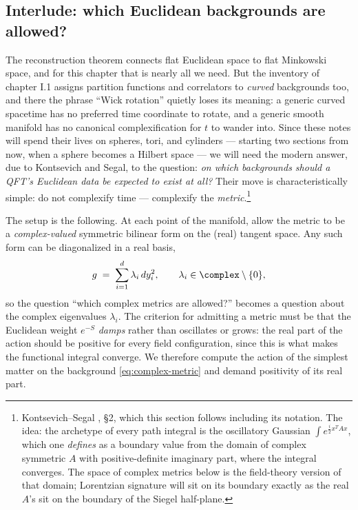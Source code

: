 \subsection{Interlude: which Euclidean backgrounds are allowed?}
\label{sec:ks-interlude}

The reconstruction theorem connects flat Euclidean space to flat Minkowski
space, and for this chapter that is nearly all we need. But the inventory of
chapter I.1 assigns partition functions and correlators to \emph{curved}
backgrounds too, and there the phrase ``Wick rotation'' quietly loses its
meaning: a generic curved spacetime has no preferred time coordinate to rotate,
and a generic smooth manifold has no canonical complexification for $t$ to
wander into. Since these notes will spend their lives on spheres, tori, and
cylinders --- starting two sections from now, when a sphere becomes a Hilbert
space --- we will need the modern answer, due to Kontsevich and Segal,
to the question: \emph{on which backgrounds should a QFT's Euclidean data be
expected to exist at all?} Their move is characteristically simple: do not
complexify time --- complexify the \emph{metric}.\footnote{Kontsevich--Segal
, \S2, which this section follows including its notation.
The idea: the archetype of every path integral is the oscillatory Gaussian
$\int e^{\frac i2 x^T A x}$, which one \emph{defines} as a boundary value from
the domain of complex symmetric $A$ with positive-definite imaginary part,
where the integral converges. The space of complex metrics below is
the field-theory version of that domain; Lorentzian signature will sit on its
boundary exactly as the real $A$'s sit on the boundary of the Siegel
half-plane.}

The setup is the following. At each point of the manifold, allow the metric
to be a \emph{complex-valued} symmetric bilinear form on the (real) tangent
space. Any such form can be diagonalized in a real basis,
\begin{equation}
g \;=\; \sum_{i=1}^{d} \lambda_i\, dy_i^2 ,
\qquad \lambda_i \in \complex\setminus\{0\},
\label{eq:complex-metric}
\end{equation}
so the question ``which complex metrics are allowed?'' becomes a question
about the complex eigenvalues $\lambda_i$. The criterion for admitting a
metric must be that the Euclidean weight $e^{-S}$ \emph{damps} rather than
oscillates or grows: the real part of the action should be positive for
every field configuration, since this is what makes the functional integral
converge. We therefore compute the action of the simplest matter on the
background \eqref{eq:complex-metric} and demand positivity of its real part.

